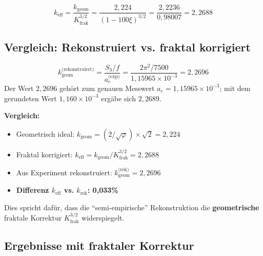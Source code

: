 	\begin{equation}
		\boxed{k_\text{eff} = \frac{k_\text{geom}}{K_\text{frak}^{3/2}} = \frac{2{,}224}{(1-100\xi)^{3/2}} = \frac{2{,}2236}{0{,}98007} = 2{,}2688}
	\end{equation}
	
	\subsection{Vergleich: Rekonstruiert vs. fraktal korrigiert}
	
	\begin{equation}
		k_{\text{geom}}^{\text{(rekonstruiert)}} = \frac{S_3/f}{a_e^{\text{(exp)}}} = \frac{2\pi^2 / 7500}{1{,}15965 \times 10^{-3}} = 2{,}2696
	\end{equation}
	Der Wert $2{,}2696$ gehört zum genauen Messwert $a_e = 1{,}15965 \times 10^{-3}$; mit dem gerundeten Wert $1{,}160 \times 10^{-3}$ ergäbe sich $2{,}2689$.

	
	\textbf{Vergleich:}
	\begin{itemize}
		\item Geometrisch ideal: $k_{\text{geom}} = (2/\sqrt{\varphi}) \times \sqrt{2} = 2{,}224$
		\item Fraktal korrigiert: $k_{\text{eff}} = k_{\text{geom}} / K_\text{frak}^{3/2} = 2{,}2688$
		\item Aus Experiment rekonstruiert: $k_{\text{geom}}^{\text{(rek)}} = 2{,}2696$
		\item \textbf{Differenz $k_\text{eff}$ vs. $k_\text{rek}$: 0{,}033\%}
	\end{itemize}
	
	Dies spricht dafür, dass die \enquote{semi-empirische} Rekonstruktion die \textbf{geometrische} fraktale Korrektur $K_\text{frak}^{3/2}$ widerspiegelt.
	
	\subsection{Ergebnisse mit fraktaler Korrektur}
	
	\begin{table}[h]
		\centering
		\caption{Absolutwerte mit geometrischem vs. fraktal korrigiertem $k_\text{eff}$}
	\end{table}
	
